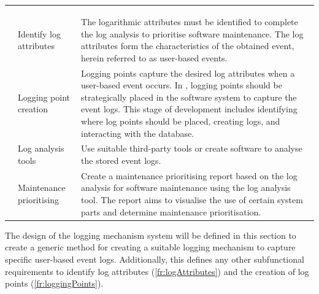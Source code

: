 \setcounter{phase}{0}
\begin{xltabular}{\textwidth}{llX}
	\caption[Functional requirements of the solution]{\textit{Functional requirements of the solution}}\label{tbl:ch2_developmenetRequirements} \\ 
	\toprule
	 &  &  \\
	\midrule
	\endfirsthead

	\caption[]{\continueCaption} \\
	\toprule
	 &  &  \\
	\midrule
	\endhead

	\midrule
	 \\ 
	\endfoot
	\endlastfoot

	 & Identify log attributes & \RaggedRight The logarithmic attributes must be identified to complete the log analysis to prioritise software maintenance. The log attributes form the characteristics of the obtained event, herein referred to as user-based events. \\

	 & Logging point creation & \RaggedRight Logging points capture the desired log attributes when a user-based event occurs. In , logging points should be strategically placed in the software system to capture the event logs. This stage of development includes identifying where log points should be placed, creating logs, and interacting with the database. \\

	 & \RaggedRight Log analysis tools & Use suitable third-party tools or create software to analyse the stored event logs. \\

	 & \RaggedRight Maintenance prioritising & Create a maintenance prioritising report based on the log analysis for software maintenance using the log analysis tool. The report aims to visualise the use of certain system parts and determine maintenance prioritisation. \\
	\bottomrule
\end{xltabular}

The design of the logging mechanism system will be defined in this section to create a generic method for creating a suitable logging mechanism to capture specific user-based event logs. Additionally, this defines any other subfunctional requirements to identify log attributes (\ref{fr:logAttributes}) and the creation of log points (\ref{fr:loggingPoints}).

